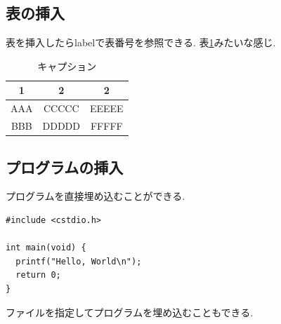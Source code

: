 \documentclass{jarticle}
\begin{document}
\subsection{表の挿入}

表を挿入したらlabelで表番号を参照できる.
表\ref{table1}みたいな感じ.

\begin{table}[htb]
  \begin{center}
    \caption{キャプション}
    \label{table1}
    \begin{tabular}{c|c|c}
      \hline
      1 & 2 & 2 \\
      \hline \hline
      AAA & CCCCC & EEEEE \\
      BBB & DDDDD & FFFFF \\
      \hline
    \end{tabular}
  \end{center}
\end{table}

\subsection{プログラムの挿入}

プログラムを直接埋め込むことができる.

\begin{lstlisting}
#include <cstdio.h>

int main(void) {
  printf("Hello, World\n");
  return 0;
}
\end{lstlisting}

ファイルを指定してプログラムを埋め込むこともできる.


\end{document}

